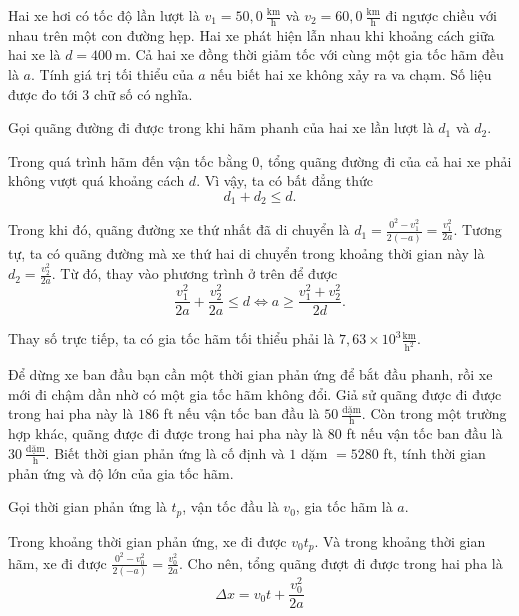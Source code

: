 \documentclass[a4paper, titlepage, openany]{book}
\newcounter{exercise}
\newcounter{solution}
\begin{document}
\exercise Hai xe hơi có tốc độ lần lượt là $v_1 = 50{,}0\ \frac{\text{km}}{\text{h}}$ và $v_2 = 60{,}0\ \frac{\text{km}}{\text{h}}$ đi ngược chiều với nhau trên một con đường hẹp. Hai xe phát hiện lẫn nhau khi khoảng cách giữa hai xe là $d = 400\ \text{m}$. Cả hai xe đồng thời giảm tốc với cùng một gia tốc hãm đều là $a$. Tính giá trị tối thiểu của $a$ nếu biết hai xe không xảy ra va chạm. Số liệu được đo tới $3$ chữ số có nghĩa.

\solution

Gọi quãng đường đi được trong khi hãm phanh của hai xe lần lượt là $d_1$ và $d_2$.

Trong quá trình hãm đến vận tốc bằng $0$, tổng quãng đường đi của cả hai xe phải không vượt quá khoảng cách $d$. Vì vậy, ta có bất đẳng thức $$d_1 + d_2 \leq d.$$

Trong khi đó, quãng đường xe thứ nhất đã di chuyển là $d_1 = \frac{0^2 - v_1^2}{2(-a)} = \frac{v_1^2}{2a}$. Tương tự, ta có quãng đường mà xe thứ hai di chuyển trong khoảng thời gian này là $d_2 = \frac{v_2^2}{2a}$. Từ đó, thay vào phương trình ở trên để được $$
   \frac{v_1^2}{2a} + \frac{v_2^2}{2a} \le d
   \iff a \geq \frac{v_1^2+v_2^2}{2d}.
$$

Thay số trực tiếp, ta có gia tốc hãm tối thiểu phải là $\boxed{7{,}63 \times 10^3 \frac{\text{km}}{\text{h}^2}}$.

\exercise Để dừng xe ban đầu bạn cần một thời gian phản ứng để bắt đầu phanh, rồi xe mới đi chậm dần nhờ có một gia tốc hãm không đổi. Giả sử quãng được đi được trong hai pha này là $186$ ft nếu vận tốc ban đầu là $50\ \frac{\text{dặm}}{\text{h}}$. Còn trong một trường hợp khác, quãng được đi được trong hai pha này là $80$ ft nếu vận tốc ban đầu là $30\ \frac{\text{dặm}}{\text{h}}$. Biết thời gian phản ứng là cố định và $1$ dặm $= 5280$ ft, tính thời gian phản ứng và độ lớn của gia tốc hãm.

\solution

Gọi thời gian phản ứng là $t_p$, vận tốc đầu là $v_0$, gia tốc hãm là $a$.

Trong khoảng thời gian phản ứng, xe đi được $v_0t_p$. Và trong khoảng thời gian hãm, xe đi được $\frac{0^2-v_0^2}{2(-a)}=\frac{v_0^2}{2a}$. Cho nên, tổng quãng đượt đi được trong hai pha là 
\begin{equation}
\Delta x = v_0 t + \frac{v_0^2}{2a}
\label{eq:stopping_distance}
\end{equation}
\end{document}

